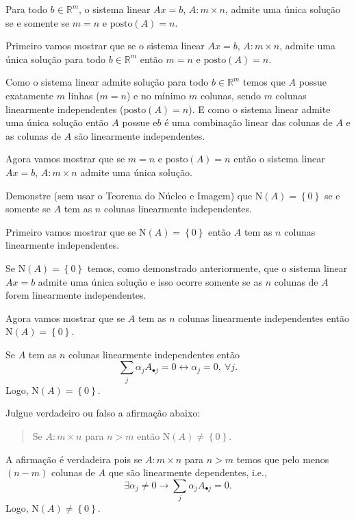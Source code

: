 \documentclass[a4paper,12pt, leqno, answers]{exam}
\newcommand{\mdot}{\bullet}
\newcommand{\EN}{\text{N}}
\newcommand{\posto}{\text{posto}}
\begin{document}
\begin{questions}
    \question Para todo $b \in \mathbb{R}^m$, o sistema linear $A x = b$, $A : m \times n$, admite uma \'{u}nica solu\c{c}\~{a}o se e somente se $m = n$ e $\posto (A) = n$.
    \begin{solution}
        Primeiro vamos mostrar que se o sistema linear $A x = b$, $A: m \times n$, admite uma \'{u}nica solu\c{c}\~{a}o para todo $b \in \mathbb{R}^m$ ent\~{a}o $m = n$ e $\posto (A) = n$.

        Como o sistema linear admite solu\c{c}\~{a}o para todo $b \in \mathbb{R}^m$ temos que $A$ possue exatamente $m$ linhas ($m = n$) e no m\'{i}nimo $m$ colunas, sendo $m$ colunas linearmente independentes ($\posto (A) = n$). E como o sistema linear admite uma \'{u}nica solu\c{c}\~{a}o ent\~{a}o $A$ possue e$b$ \'{e} uma combina\c{c}\~{a}o linear das colunas de $A$ e as colunas de $A$ s\~{a}o linearmente independentes. 

        Agora vamos mostrar que se $m = n$ e $\posto (A) = n$ ent\~{a}o o sistema linear $A x = b$, $A: m \times n$ admite uma \'{u}nica solu\c{c}\~{a}o.
        
    \end{solution}

    \question Demonstre (sem usar o Teorema do N\'{u}cleo e Imagem) que $\EN (A) = \left\{ 0 \right\}$ se e somente se $A$ tem as $n$ colunas linearmente independentes.
    \begin{solution}
        Primeiro vamos mostrar que se $\EN (A) = \left\{ 0 \right\}$ ent\~{a}o $A$ tem as $n$ colunas linearmente independentes.

        Se $\EN (A) = \left\{ 0 \right\}$ temos, como demonstrado anteriormente, que o sistema linear $A x = b$ admite uma \'{u}nica solu\c{c}\~{a}o e isso ocorre somente se as $n$ colunas de $A$ forem linearmente independentes.

        Agora vamos mostrar que se $A$ tem as $n$ colunas linearmente independentes ent\~{a}o $\EN (A) = \left\{ 0 \right\}$.

        Se $A$ tem as $n$ colunas linearmente independentes ent\~{a}o
        \[
        \sum_j \alpha_j A_{\mdot j} = 0 \leftrightarrow \alpha_j = 0, \  \forall j.
        \]
        Logo, $\EN (A) = \left\{ 0 \right\}$.
    \end{solution}

    \question Julgue verdadeiro ou falso a afirma\c{c}\~{a}o abaixo:
    \begin{quote}
        Se $A: m \times n$ para $n > m$ ent\~{a}o $\EN (A) \neq \left\{ 0 \right\}$.
    \end{quote}
    \begin{solution}
        A afirma\c{c}\~{a}o \'{e} verdadeira pois se $A: m \times n$ para $n > m$ temos que pelo menos $\left( n - m \right)$ colunas de $A$ que s\~{a}o linearmente dependentes, i.e.,
        \[
        \exists \alpha_j \neq 0 \rightarrow \sum_j \alpha_j A_{\mdot j} = 0.
        \]
        Logo, $\EN (A) \neq \left\{ 0 \right\}$.
    \end{solution}


\end{questions}
\end{document}
